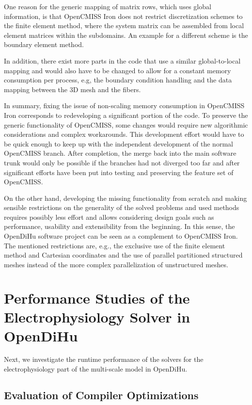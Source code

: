 One reason for the generic mapping of matrix rows, which uses global information, is that OpenCMISS Iron does not restrict discretization schemes to the finite element method, where the system matrix can be assembled from local element matrices within the subdomains. An example for a different scheme is the boundary element method.

In addition, there exist more parts in the code that use a similar global-to-local mapping and would also have to be changed to allow for a constant memory consumption per process, e.g, the boundary condition handling and the data mapping between the 3D mesh and the fibers.

In summary, fixing the issue of non-scaling memory consumption in OpenCMISS Iron corresponds to redeveloping a significant portion of the code. 
To preserve the generic functionality of OpenCMISS, some changes would require new algorithmic considerations and complex workarounds.
This development effort would have to be quick enough to keep up with the independent development of the normal OpenCMISS branch. After completion, the merge back into the main software trunk would only be possible if the branches had not diverged too far and after significant efforts have been put into testing and preserving the feature set of OpenCMISS.

On the other hand, developing the missing functionality from scratch and making sensible restrictions on the generality of the solved problems and used methods requires possibly less effort and allows considering design goals such as performance, usability and extensibility from the beginning.
In this sense, the OpenDiHu software project can be seen as a complement to OpenCMISS Iron.  %
The mentioned restrictions are, e.g., the exclusive use of the finite element method and Cartesian coordinates and the use of parallel partitioned structured meshes instead of the more complex parallelization of unstructured meshes.




\section{Performance Studies of the Electrophysiology Solver in OpenDiHu}
Next, we investigate the runtime performance of the solvers for the electrophysiology part of the multi-scale model in OpenDiHu.

\subsection{Evaluation of Compiler Optimizations}


